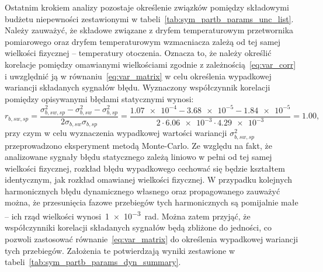 Ostatnim krokiem analizy pozostaje określenie związków pomiędzy składowymi budżetu niepewności zestawionymi w tabeli~\ref{tab:sym_partb_params_unc_list}. Należy zauważyć, że składowe związane z dryfem temperaturowym przetwornika pomiarowego oraz dryfem temperaturowym wzmacniacza zależą od tej samej wielkości fizycznej -- temperatury otoczenia. Oznacza to, że należy określić korelacje pomiędzy omawianymi wielkościami zgodnie z zależnością~\eqref{eq:var_corr} i uwzględnić ją w równaniu~\eqref{eq:var_matrix} w celu określenia wypadkowej wariancji składanych sygnałów błędu. Wyznaczony współczynnik korelacji pomiędzy opisywanymi błędami statycznymi wynosi:
\begin{equation}
r_{b,sw,sp} = \frac{\sigma_{b,sw,sp}^{2} - \sigma_{b,sw}^{2} - \sigma_{b,sp}^{2}}{2 \sigma_{b,sw} \sigma_{b,sp}} = \frac{\num{1.07e-4} - \num{3.68e-5} - \num{1.84e-5}}{2 \cdot \num{6.06e-3} \cdot \num{4.29e-3}} = 1.00 \label{eq:sym_partb_stat_corr},
\end{equation}
przy czym w celu wyznaczenia wypadkowej wartości wariancji $\sigma_{b,sw,sp}^{2}$ przeprowadzono eksperyment metodą Monte-Carlo. Ze względu na fakt, że analizowane sygnały błędu statycznego zależą liniowo w pełni od tej samej wielkości fizycznej, rozkład błędu wypadkowego cechować się będzie kształtem identycznym, jak rozkład omawianej wielkości fizycznej. W przypadku kolejnych harmonicznych błędu dynamicznego własnego oraz propagowanego zauważyć można, że przesunięcia fazowe przebiegów tych harmonicznych są pomijalnie małe -- ich rząd wielkości wynosi~\qty{1e-3}{rad}. Można zatem przyjąć, że współczynniki korelacji składanych sygnałów będą zbliżone do jedności, co pozwoli zastosować równanie~\eqref{eq:var_matrix} do określenia wypadkowej wariancji tych przebiegów. Założenia te potwierdzają wyniki zestawione w tabeli~\ref{tab:sym_partb_params_dyn_summary}.

